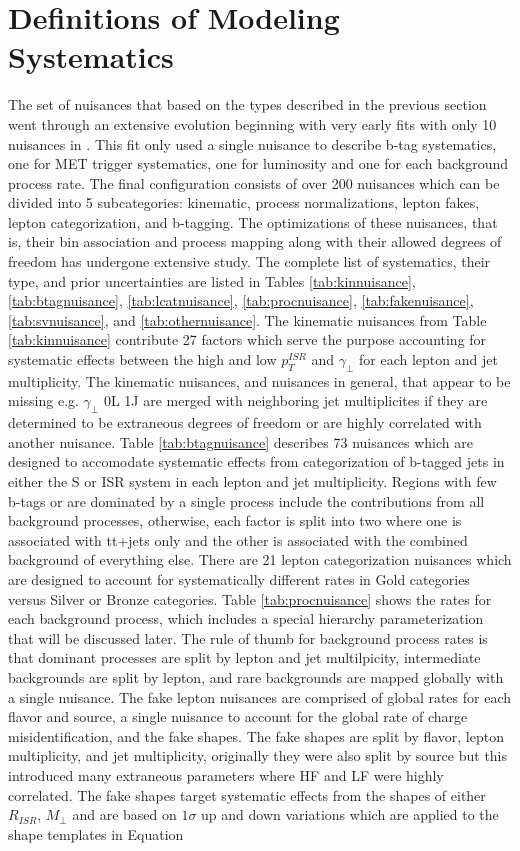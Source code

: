 \section{Definitions of Modeling Systematics}
The set of nuisances that based on the types described in the previous section went through an extensive evolution beginning with very early fits with only 10 nuisances in \cite{erich thesis}. This fit only used a single nuisance to describe b-tag systematics, one for MET trigger systematics, one for luminosity and one for each background process rate. The final configuration consists of over 200 nuisances which can be divided into 5 subcategories: kinematic, process normalizations, lepton fakes, lepton categorization, and b-tagging. The optimizations of these nuisances, that is, their bin association and process mapping along with their allowed degrees of freedom has undergone extensive study. The complete list of systematics, their type, and prior uncertainties are listed in Tables \ref{tab:kinnuisance}, \ref{tab:btagnuisance}, \ref{tab:lcatnuisance}, \ref{tab:procnuisance}, \ref{tab:fakenuisance}, \ref{tab:svnuisance}, and \ref{tab:othernuisance}.  The kinematic nuisances from Table \ref{tab:kinnuisance} contribute 27 factors which serve the purpose accounting for systematic effects between the high and low $p_T^{ISR}$ and $\gamma_\perp$ for each lepton and jet multiplicity. The kinematic nuisances, and nuisances in general, that appear to be missing e.g. $\gamma_\perp$ 0L 1J are merged with neighboring jet multiplicites if they are determined to be extraneous degrees of freedom or are highly correlated with another nuisance. Table \ref{tab:btagnuisance} describes 73 nuisances which are designed to accomodate systematic effects from categorization of b-tagged jets in either the S or ISR system in each lepton and jet multiplicity. Regions with few b-tags or are dominated by a single process include the contributions from all background processes, otherwise, each factor is split into two where one is associated with tt+jets only and the other is associated with the combined background of everything else. There are 21 lepton categorization nuisances which are designed to account for systematically different rates in Gold categories versus Silver or Bronze categories. Table \ref{tab:procnuisance} shows the rates for each background process, which includes a special hierarchy parameterization that will be discussed later. The rule of thumb for background process rates is that dominant processes are split by lepton and jet multilpicity, intermediate backgrounds are split by lepton, and rare backgrounds are mapped globally with a single nuisance. The fake lepton nuisances are comprised of global rates for each flavor and source, a single nuisance to account for the global rate of  charge misidentification, and the fake shapes. The fake shapes are split by flavor, lepton multiplicity, and jet multiplicity, originally they were also split by source but this introduced many extraneous parameters where HF and LF were highly correlated. The fake shapes target systematic effects from the shapes of either $R_{ISR}$, $M_\perp$ and are based on $1\sigma$ up and down variations which are applied to the shape templates in Equation 